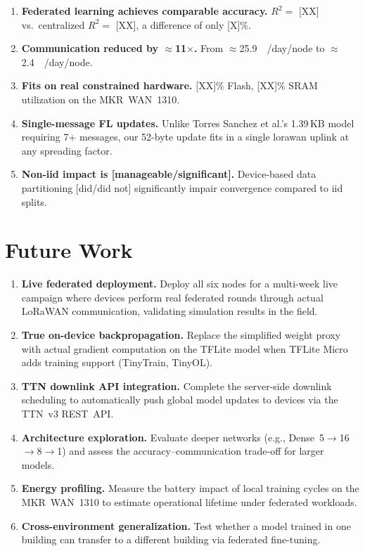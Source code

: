 \begin{enumerate}
  \item \textbf{Federated learning achieves comparable accuracy.}
    $R^2 = $ [XX] vs.\ centralized $R^2 = $ [XX], a difference of only [X]\%.

  \item \textbf{Communication reduced by $\approx$11$\times$.}
    From $\approx$\SI{25.9}{\kilo\byte}/day/node to $\approx$\SI{2.4}{\kilo\byte}/day/node.

  \item \textbf{Fits on real constrained hardware.}
    [XX]\% Flash, [XX]\% SRAM utilization on the MKR~WAN~1310.

  \item \textbf{Single-message FL updates.}
    Unlike Torres Sanchez et al.'s 1.39\,KB model requiring 7+ messages, our
    52-byte update fits in a single \gls{lorawan} uplink at any spreading factor.

  \item \textbf{Non-\gls{iid} impact is [manageable/significant].}
    Device-based data partitioning [did/did not] significantly impair convergence
    compared to \gls{iid} splits.
\end{enumerate}

\section{Future Work}
\label{sec:future-work}

\begin{enumerate}
  \item \textbf{Live federated deployment.}
    Deploy all six nodes for a multi-week live campaign where devices perform real
    federated rounds through actual LoRaWAN communication, validating simulation
    results in the field.

  \item \textbf{True on-device backpropagation.}
    Replace the simplified weight proxy with actual gradient computation on the
    TFLite model when TFLite Micro adds training support (TinyTrain, TinyOL).

  \item \textbf{TTN downlink API integration.}
    Complete the server-side downlink scheduling to automatically push global
    model updates to devices via the TTN~v3 REST~API.

  \item \textbf{Architecture exploration.}
    Evaluate deeper networks (e.g., Dense~5$\to$16$\to$8$\to$1) and assess
    the accuracy--communication trade-off for larger models.

  \item \textbf{Energy profiling.}
    Measure the battery impact of local training cycles on the MKR~WAN~1310
    to estimate operational lifetime under federated workloads.

  \item \textbf{Cross-environment generalization.}
    Test whether a model trained in one building can transfer to a different
    building via federated fine-tuning.
\end{enumerate}
